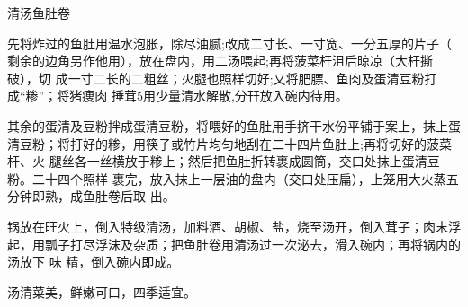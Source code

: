 \begin{recipe}{清汤鱼肚卷}

\ingredients


\preparation

\step 先将炸过的鱼肚用温水泡胀，除尽油腻;改成二寸长、一寸宽、一分五厚的片子（
剩余的边角另作他用），放在盘内，用二汤喂起;再将菠菜杆沮后晾凉（大杆撕破），切
成一寸二长的二粗丝；火腿也照样切好;又将肥膘、鱼肉及蛋清豆粉打成“糁”；将猪痩肉
捶茸5用少量清水解散,分幵放入碗内待用。

\step 其余的蛋清及豆粉拌成蛋清豆粉，将喂好的鱼肚用手挤干水份平铺于案上，抹上蛋
清豆粉；将打好的糁，用筷子或竹片均匀地刮在二十四片鱼肚上;再将切好的菠菜杆、火
腿丝各一丝横放于糁上；然后把鱼肚折转裹成圆筒，交口处抹上蛋清豆粉。二十四个照样
裹完，放入抹上一层油的盘内（交口处压扁），上笼用大火蒸五分钟即熟，成鱼肚卷后取
出。

\step 锅放在旺火上，倒入特级清汤，加料酒、胡椒、盐，烧至汤开，倒入茸子；肉末浮
起，用瓢子打尽浮沫及杂质；把鱼肚卷用清汤过一次泌去，滑入碗内；再将锅内的汤放下
味 精，倒入碗内即成。

\features

汤清菜美，鲜嫩可口，四季适宜。

\end{recipe}

